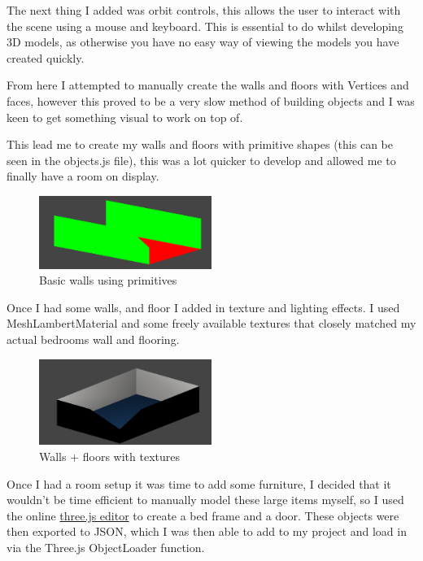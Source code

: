 \documentclass[runningheads,a4paper]{llncs}
\begin{document}
  The next thing I added was orbit controls, this allows the user to interact with the scene using a mouse and keyboard. This is essential to do whilst developing 3D models, as otherwise you have no easy way of viewing the models you have created quickly. 

  From here I attempted to manually create the walls and floors with Vertices and faces, however this proved to be a very slow method of building objects and I was keen to get something visual to work on top of. 

  This lead me to create my walls and floors with primitive shapes (this can be seen in the objects.js file), this was a lot quicker to develop and allowed me to finally have a room on display. 

  \begin{figure}[H]
    \centering
    \includegraphics[width=0.5\textwidth]{images/2.png}
    \caption{Basic walls using primitives}
    \label{fig:window}
  \end{figure}
  
  Once I had some walls, and floor I added in texture and lighting effects. I used MeshLambertMaterial and some freely available textures that closely matched my actual bedrooms wall and flooring.

  \begin{figure}[H]
    \centering
    \includegraphics[width=0.5\textwidth]{images/3.png}
    \caption{Walls + floors with textures}
    \label{fig:window}
  \end{figure}

  Once I had a room setup it was time to add some furniture, I decided that it wouldn't be time efficient to manually model these large items myself, so I used the online \href{https://threejs.org/editor/}{three.js editor} to create a bed frame and a door.
  These objects were then exported to JSON, which I was then able to add to my project and load in via the Three.js ObjectLoader function. 
\end{document}
